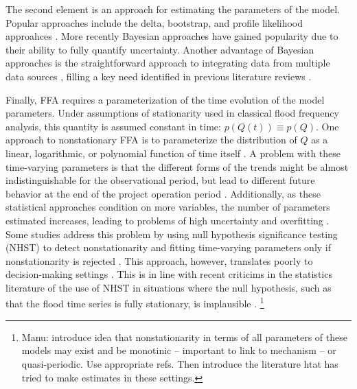 \documentclass[11pt]{article}
\begin{document}
The second element is an approach for estimating the parameters of the model.
Popular approaches include the delta, bootstrap, and profile likelihood approahces \citep{Obeysekera2014}.
More recently Bayesian approaches have gained popularity due to their ability to fully quantify uncertainty.
Another advantage of Bayesian approaches is the straightforward approach to integrating data from multiple data sources \citep[\ie][]{Sun2014,Lima2016,Bracken2016,Steinschneider2015b}, filling a key need identified in previous literature reviews \citep{Merz2014,Merz2008}.

Finally, FFA requires a parameterization of the time evolution of the model parameters.
Under assumptions of stationarity used in classical flood frequency analysis, this quantity is assumed constant in time: $p(Q(t)) \equiv p(Q)$.
One approach to nonstationary FFA is to parameterize the distribution of $Q$ as a linear, logarithmic, or polynomial function of time itself \citep{Obeysekera2014,Vogel2011,Serinaldi2015,Strupczewski2001}.
A problem with these time-varying parameters is that the different forms of the trends might be almost indistinguishable for the observational period, but lead to different future behavior at the end of the project operation period \citep{Rootzen2013,Serinaldi2015}.
Additionally, as these statistical approaches condition on more variables, the number of parameters estimated increases, leading to problems of high uncertainty and overfitting \citep{Serinaldi2015}.
Some studies address this problem by using null hypothesis significance testing (NHST) to detect nonstationarity and fitting time-varying parameters only if nonstationarity is rejected \citep[\ie][]{Obeysekera2014,Luke2017}.
This approach, however, translates poorly to decision-making settings \citep{Rosner2014,Vogel2013}.
This is in line with recent criticims in the statistics literature of the use of NHST in situations where the null hypothesis, such as that the flood time series is fully stationary, is implausible \citep{gelman2016problems,Gelman2014a,McShane2017}.
\footnote{Manu: introduce idea that nonstationarity in terms of all parameters of these models may exist and be monotinic -- important to link to mechanism -- or quasi-periodic. Use appropriate refs. Then introduce the literature htat has tried to make estimates in these settings.}
\end{document}
